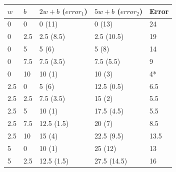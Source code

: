 \begin{table}[ht]
\centering
\begin{tabular}{p{}p{}p{}p{}p{}}
\toprule
\textbf{$w$} & \textbf{$b$} & $2w + b$ ($error_1$) & $5w + b$ ($error_2$) & \textbf{Error} \\
\midrule
0   & 0   & 0 \hspace{0.5em} (11)   & 0 \hspace{0.5em} (13)   & 24 \\
0   & 2.5 & 2.5 \hspace{0.5em} (8.5) & 2.5 \hspace{0.5em} (10.5) & 19 \\
0   & 5   & 5 \hspace{0.5em} (6)     & 5 \hspace{0.5em} (8)     & 14 \\
0   & 7.5 & 7.5 \hspace{0.5em} (3.5) & 7.5 \hspace{0.5em} (5.5) & 9 \\
0   & 10  & 10 \hspace{0.5em} (1)    & 10 \hspace{0.5em} (3)    & 4* \\
2.5 & 0   & 5 \hspace{0.5em} (6)     & 12.5 \hspace{0.5em} (0.5) & 6.5 \\
2.5 & 2.5 & 7.5 \hspace{0.5em} (3.5) & 15 \hspace{0.5em} (2)     & 5.5 \\
2.5 & 5   & 10 \hspace{0.5em} (1)    & 17.5 \hspace{0.5em} (4.5) & 5.5 \\
2.5 & 7.5 & 12.5 \hspace{0.5em} (1.5) & 20 \hspace{0.5em} (7)     & 8.5 \\
2.5 & 10  & 15 \hspace{0.5em} (4)    & 22.5 \hspace{0.5em} (9.5) & 13.5 \\
5   & 0   & 10 \hspace{0.5em} (1)    & 25 \hspace{0.5em} (12)    & 13 \\
5   & 2.5 & 12.5 \hspace{0.5em} (1.5) & 27.5 \hspace{0.5em} (14.5) & 16 \\

\end{tabular}
\end{table}
